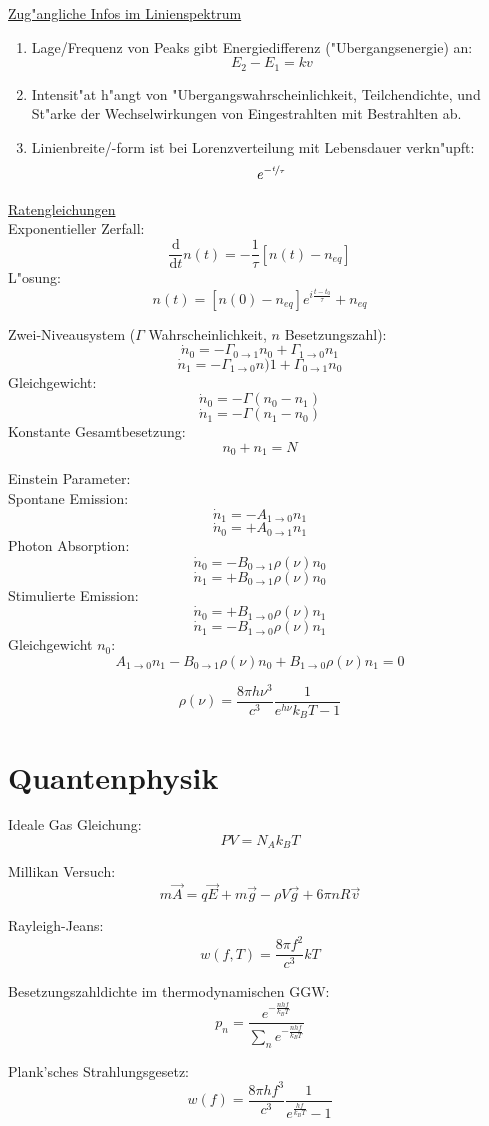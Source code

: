 \documentclass[12pt]{report}
\newcommand{\dd}{\mathrm{d}}
\begin{document}
\underline{Zug"angliche Infos im Linienspektrum}
\begin{enumerate}
\item Lage/Frequenz von Peaks gibt Energiedifferenz ("Ubergangsenergie) an:
\[E_2-E_1=kv\]
\item Intensit"at h"angt von "Ubergangswahrscheinlichkeit, Teilchendichte, und St"arke der Wechselwirkungen von Eingestrahlten mit Bestrahlten ab.
\item Linienbreite/-form ist bei Lorenzverteilung mit Lebensdauer verkn"upft:
\[e^{-\nicefrac{t}{\tau}}\]
\end{enumerate}

\underline{Ratengleichungen}\\
Exponentieller Zerfall:
\[\frac{\dd}{\dd t}n(t)=-\frac{1}{\tau}[n(t)-n_{eq}]\]
L"osung:
\[n(t)=[n(0)-n_{eq}]e^{i\frac{t-t_0}{\tau}}+n_{eq}\]

Zwei-Niveausystem ($\Gamma$ Wahrscheinlichkeit, $n$ Besetzungszahl):
\[\dot{n}_0=-\Gamma_{0\to1}n_0+\Gamma_{1\to0}n_1\]
\[\dot{n}_1=-\Gamma_{1\to0}n)1+\Gamma_{0\to1}n_0\]
Gleichgewicht:
\[\dot{n}_0=-\Gamma(n_0-n_1)\]
\[\dot{n}_1=-\Gamma(n_1-n_0)\]
Konstante Gesamtbesetzung:
\[n_0+n_1=N\]

Einstein Parameter:\\
Spontane Emission:
\[\dot{n}_1=-A_{1\to0}n_1\]
\[\dot{n}_0=+A_{0\to1}n_1\]
Photon Absorption:
\[\dot{n}_0=-B_{0\to1}\rho(\nu)n_0\]
\[\dot{n}_1=+B_{0\to1}\rho(\nu)n_0\]
Stimulierte Emission:
\[\dot{n}_0=+B_{1\to0}\rho(\nu)n_1\]
\[\dot{n}_1=-B_{1\to0}\rho(\nu)n_1\]
Gleichgewicht $n_0$:
\[A_{1\to0}n_1-B_{0\to1}\rho(\nu)n_0+B_{1\to0}\rho(\nu)n_1=0\]

\[\rho(\nu)=\frac{8\pi h\nu^3}{c^3}\frac{1}{e^{h\nu}{k_BT}-1}\]

\section{Quantenphysik}

Ideale Gas Gleichung:
\[PV=N_Ak_BT\]

Millikan Versuch:
\[m\vec{A}=q\vec{E}+m\vec{g}-\rho V\vec{g}+6\pi nR\vec{v}\]

Rayleigh-Jeans:
\[w(f,T)=\frac{8\pi f^2}{c^3}kT\]

Besetzungszahldichte im thermodynamischen GGW:
\[p_n=\frac{e^{-\frac{nhf}{k_BT}}}{\sum_ne^{-\frac{nhf}{k_BT}}}\]

Plank'sches Strahlungsgesetz:
\[w(f)=\frac{8\pi hf^3}{c^3}\frac{1}{e^\frac{hf}{k_BT}-1}\]
\end{document}
